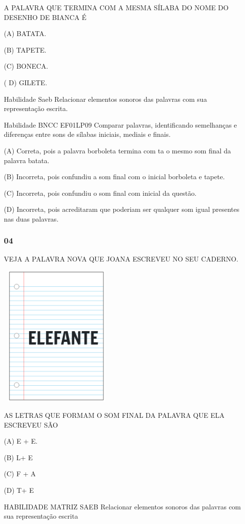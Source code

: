 \begin{escola}
A PALAVRA QUE TERMINA COM A MESMA SÍLABA DO NOME DO DESENHO DE BIANCA É

(A) BATATA.

(B) TAPETE.

(C) BONECA.

( D) GILETE.

Habilidade Saeb Relacionar elementos sonoros das palavras com sua
representação escrita.

Habilidade BNCC EF01LP09 Comparar palavras, identificando semelhanças e
diferenças entre sons de sílabas iniciais, mediais e finais.

(A) Correta, pois a palavra borboleta termina com ta o mesmo som final
da palavra batata.

(B) Incorreta, pois confundiu a som final com o inicial borboleta e
tapete.

(C) Incorreta, pois confundiu o som final com inicial da questão.

(D) Incorreta, pois acreditaram que poderiam ser qualquer som igual
presentes nas duas palavras.

\subsubsection{04}\label{section-60}

VEJA A PALAVRA NOVA QUE JOANA ESCREVEU NO SEU CADERNO.

\includegraphics[width=2.24931in,height=2.80435in]{media/image230.png}

AS LETRAS QUE FORMAM O SOM FINAL DA PALAVRA QUE ELA ESCREVEU SÃO

(A) E + E.

(B) L+ E

(C) F + A

(D) T+ E

HABILIDADE MATRIZ SAEB Relacionar elementos sonoros das palavras com sua
representação escrita


\end{escola}
